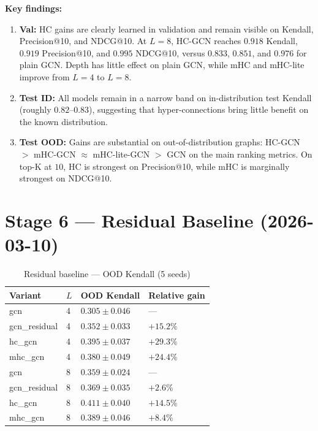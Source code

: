\documentclass[11pt,a4paper]{article}
\begin{document}
\textbf{Key findings:}
\begin{enumerate}
  \item \textbf{Val:} HC gains are clearly learned in validation and remain visible on
        Kendall, Precision@10, and NDCG@10. At $L=8$, HC-GCN reaches
        $0.918$ Kendall, $0.919$ Precision@10, and $0.995$ NDCG@10,
        versus $0.833$, $0.851$, and $0.976$ for plain GCN. Depth has little
        effect on plain GCN, while mHC and mHC-lite improve from $L=4$ to $L=8$.
  \item \textbf{Test ID:} All models remain in a narrow band on in-distribution test
        Kendall (roughly $0.82$--$0.83$), suggesting that hyper-connections bring
        little benefit on the known distribution.
  \item \textbf{Test OOD:} Gains are substantial on out-of-distribution graphs:
        HC-GCN $>$ mHC-GCN $\approx$ mHC-lite-GCN $>$ GCN on the main ranking
        metrics. On top-K at $10$, HC is strongest on Precision@10, while mHC is
        marginally strongest on NDCG@10.
\end{enumerate}

\section{Stage 6 --- Residual Baseline (2026-03-10)}

\begin{table}[h]
\centering
\caption{Residual baseline --- OOD Kendall (5 seeds)}
\begin{tabular}{L{3.5cm} C{1.2cm} R{3.5cm} R{3cm}}
\toprule
Variant & $L$ & OOD Kendall & Relative gain \\
\midrule
gcn             & 4 & $0.305\pm0.046$ & --- \\
gcn\_residual   & 4 & $0.352\pm0.033$ & $+15.2\%$ \\
hc\_gcn         & 4 & $0.395\pm0.037$ & $+29.3\%$ \\
mhc\_gcn        & 4 & $0.380\pm0.049$ & $+24.4\%$ \\
\midrule
gcn             & 8 & $0.359\pm0.024$ & --- \\
gcn\_residual   & 8 & $0.369\pm0.035$ & $+2.6\%$ \\
hc\_gcn         & 8 & $\mathbf{0.411\pm0.040}$ & $+14.5\%$ \\
mhc\_gcn        & 8 & $0.389\pm0.046$ & $+8.4\%$ \\
\bottomrule
\end{tabular}
\end{table}
\end{document}
